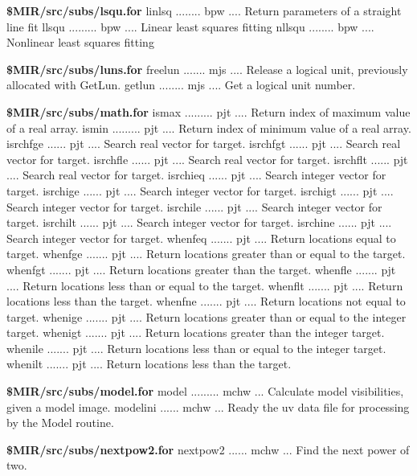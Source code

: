 \par{\bf \$MIR/src/subs/lsqu.for}
{\eightpoint\begintt
linlsq ........ bpw .... Return parameters of a straight line fit
llsqu ......... bpw .... Linear least squares fitting
nllsqu ........ bpw .... Nonlinear least squares fitting
\endtt}
\par{\bf \$MIR/src/subs/luns.for}
{\eightpoint\begintt
freelun ....... mjs .... Release a logical unit, previously allocated with GetLun.
getlun ........ mjs .... Get a logical unit number.
\endtt}
\par{\bf \$MIR/src/subs/math.for}
{\eightpoint\begintt
ismax ......... pjt .... Return index of maximum value of a real array.
ismin ......... pjt .... Return index of minimum value of a real array.
isrchfge ...... pjt .... Search real vector for target.
isrchfgt ...... pjt .... Search real vector for target.
isrchfle ...... pjt .... Search real vector for target.
\endtt}
{\eightpoint\begintt
isrchflt ...... pjt .... Search real vector for target.
isrchieq ...... pjt .... Search integer vector for target.
isrchige ...... pjt .... Search integer vector for target.
isrchigt ...... pjt .... Search integer vector for target.
isrchile ...... pjt .... Search integer vector for target.
\endtt}
{\eightpoint\begintt
isrchilt ...... pjt .... Search integer vector for target.
isrchine ...... pjt .... Search integer vector for target.
whenfeq ....... pjt .... Return locations equal to target.
whenfge ....... pjt .... Return locations greater than or equal to the target.
whenfgt ....... pjt .... Return locations greater than the target.
\endtt}
{\eightpoint\begintt
whenfle ....... pjt .... Return locations less than or equal to the target.
whenflt ....... pjt .... Return locations less than the target.
whenfne ....... pjt .... Return locations not equal to target.
whenige ....... pjt .... Return locations greater than or equal to the integer target.
whenigt ....... pjt .... Return locations greater than the integer target.
\endtt}
{\eightpoint\begintt
whenile ....... pjt .... Return locations less than or equal to the integer target.
whenilt ....... pjt .... Return locations less than the target.
\endtt}
\par{\bf \$MIR/src/subs/model.for}
{\eightpoint\begintt
model ......... mchw ... Calculate model visibilities, given a model image.
modelini ...... mchw ... Ready the uv data file for processing by the Model routine.
\endtt}
\par{\bf \$MIR/src/subs/nextpow2.for}
{\eightpoint\begintt
nextpow2 ...... mchw ... Find the next power of two.
\endtt}
